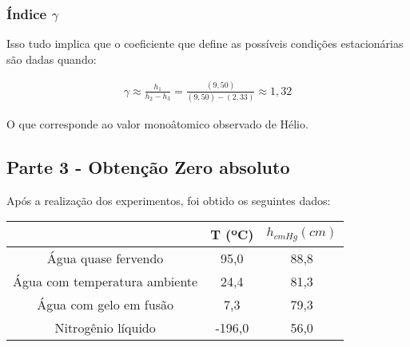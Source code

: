 \documentclass[a4paper]{ltxdoc}
\numberwithin{equation}{section}
\begin{document}
\subsubsection{Índice $\gamma$}







\begin{tcolorbox}[colback=white, colframe=blue!40!black, title=\textbf{Computando o indice $\gamma$} ]

Isso tudo implica que o coeficiente que define as possíveis condições estacionárias são dadas
quando:

\begin{align}
\gamma \approx \frac{h_1}{h_2-h_3} = \frac{(9,50)}{(9,50) - (2,33)} \approx 1,32 
\end{align}

O que corresponde ao valor monoâtomico observado de Hélio.

\end{tcolorbox} 








\subsection{Parte 3 - Obtenção Zero absoluto}

Após a realização dos experimentos, foi obtido os seguintes dados:

\vspace{\baselineskip}

\begin{table}[H]
\begin{tabular}{c|c|c|}
\cline{2-3}
                                                                              & \cellcolor[HTML]{5B9BD5}T (ºC) & \cellcolor[HTML]{5B9BD5}$h_{cm Hg} (cm)$ \\ \hline
\multicolumn{1}{|c|}{\cellcolor[HTML]{FFE699}Água quase fervendo}             & 95,0                             & 88,8                                     \\ \hline
\multicolumn{1}{|c|}{\cellcolor[HTML]{FFE699}Água com   temperatura ambiente} & 24,4                             & 81,3                                     \\ \hline
\multicolumn{1}{|c|}{\cellcolor[HTML]{FFE699}Água com gelo   em fusão}        & 7,3                              & 79,3                                     \\ \hline
\multicolumn{1}{|c|}{\cellcolor[HTML]{FFE699}Nitrogênio   líquido}            & -196,0                           & 56,0                                     \\ \hline
\end{tabular}
\end{table}
\end{document}
